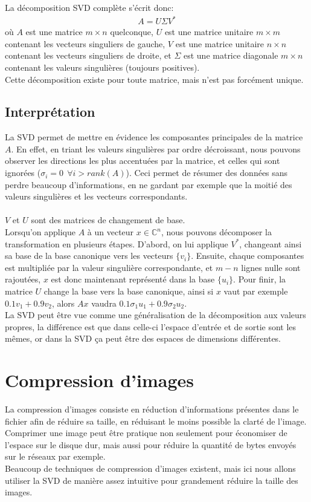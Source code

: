 \documentclass[11pt]{article}
\begin{document}
La décomposition SVD complète s'écrit donc:
\begin{align*}
	A = U \Sigma V^*
\end{align*}
où $A$ est une matrice $m\times n$ quelconque, $U$ est une matrice unitaire $m\times m$ contenant les vecteurs singuliers de gauche, $V$ est une matrice unitaire $n \times n$ contenant les vecteurs singuliers de droite, et $\Sigma$ est une matrice diagonale $m \times n$ contenant les valeurs singulières (toujours positives).\\
Cette décomposition existe pour toute matrice, mais n'est pas forcément unique.

\subsection*{Interprétation}
La SVD permet de mettre en évidence les composantes principales de la matrice $A$. En effet, en triant les valeurs singulières par ordre décroissant, nous pouvons observer les directions les plus accentuées par la matrice, et celles qui sont ignorées ($\sigma_i = 0 ~~ \forall i > rank(A)$). Ceci permet de résumer des données sans perdre beaucoup d'informations, en ne gardant par exemple que la moitié des valeurs singulières et les vecteurs correspondants.\\\\
$V$ et $U$ sont des matrices de changement de base.\\
Lorsqu'on applique $A$ à un vecteur $x \in \mathbb{C}^n$, nous pouvons décomposer la transformation en plusieurs étapes. D'abord, on lui applique $V^*$, changeant ainsi sa base de la base canonique vers les vecteurs $\{v_i\}$. Ensuite, chaque composantes est multipliée par la valeur singulière correspondante, et $m-n$ lignes nulle sont rajoutées, $x$ est donc maintenant représenté dans la base $\{u_i\}$. Pour finir, la matrice $U$ change la base vers la base canonique, ainsi si $x$ vaut par exemple $0.1v_1+0.9v_2$, alors $Ax$ vaudra $0.1\sigma_1u_1+0.9\sigma_2u_2$.\\
La SVD peut être vue comme une généralisation de la décomposition aux valeurs propres, la différence est que dans celle-ci l'espace d'entrée et de sortie sont les mêmes, or dans la SVD ça peut être des espaces de dimensions différentes.\\

\section*{Compression d'images}
La compression d'images consiste en réduction d'informations présentes dans le fichier afin de réduire sa taille, en réduisant le moins possible la clarté de l'image. Comprimer une image peut être pratique non seulement pour économiser de l'espace sur le disque dur, mais aussi pour réduire la quantité de bytes envoyés sur le réseaux par exemple.\\
Beaucoup de techniques de compression d'images existent, mais ici nous allons utiliser la SVD de manière assez intuitive pour grandement réduire la taille des images.
\end{document}
